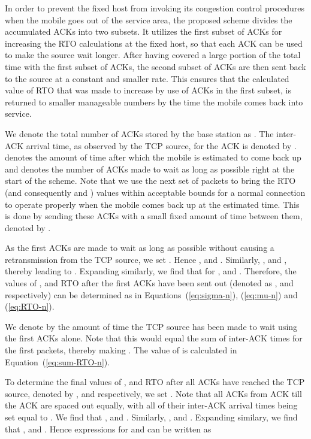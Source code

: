 \documentclass[conference]{IEEEtran}
\begin{document}
In order to prevent the fixed host from invoking its congestion control procedures when the mobile goes out of the service area, the proposed scheme divides the accumulated ACKs into two subsets. It utilizes the first subset of ACKs for increasing the RTO calculations at the fixed host, so that each ACK can be used to make the source wait longer. After having covered a large portion of the total time with the first subset of ACKs, the second subset of ACKs are then sent back to the source at a constant and smaller rate. This ensures that the calculated value of RTO that was made to increase by use of ACKs in the first subset, is returned to smaller manageable numbers by the time the mobile comes back into service.  

We denote the total number of ACKs stored by the base station as . The inter-ACK arrival time, as observed by the TCP source, for the  ACK is denoted by .  denotes the amount of time after which the mobile is estimated to come back up and  denotes the number of ACKs made to wait as long as possible right at the start of the scheme. Note that we use the next set of  packets to bring the RTO (and consequently  and ) values within acceptable bounds for a normal connection to operate properly when the mobile comes back up at the estimated time. This is done by sending these  ACKs with a small fixed amount of time between them, denoted by . 

As the first  ACKs are made to wait as long as possible without causing a retransmission from the TCP source, we set . Hence ,  and . Similarly, ,  and , thereby leading to . Expanding similarly, we find that for ,  and . Therefore, the values of ,  and RTO after the first  ACKs have been sent out (denoted as ,  and  respectively) can be determined as in Equations~(\ref{eq:sigma-n}), (\ref{eq:mu-n}) and (\ref{eq:RTO-n}). 





We denote by  the amount of time the TCP source has been made to wait using the first  ACKs alone. Note that this would equal the sum of inter-ACK times for the first  packets, thereby making . The value of  is calculated in Equation~(\ref{eq:sum-RTO-n}).

To determine the final values of ,  and RTO after all  ACKs have reached the TCP source, denoted by ,  and  respectively, we set . Note that all ACKs from  ACK till the  ACK are spaced out equally, with all of their inter-ACK arrival times being set equal to . We find that ,  and . Similarly, ,  and . Expanding similary, we find that ,  and . Hence expressions for  and  can be written as
\end{document}
